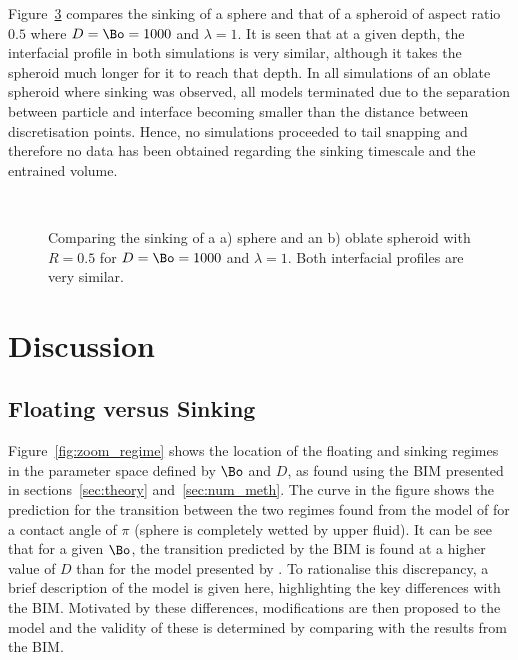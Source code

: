 {Figure~\ref{fig:sinking_comp} compares the sinking of a sphere and that of a spheroid of aspect ratio $0.5$ where $D = \Bo = 1000$ and $\lambda = 1$. It is seen that at a given depth, the interfacial profile in both simulations is very similar, although it takes the spheroid much longer for it to reach that depth. In all simulations of an oblate spheroid where sinking was observed, all models terminated due to the separation between particle and interface becoming smaller than the distance between discretisation points. Hence, no simulations proceeded to tail snapping and therefore no data has been obtained regarding the sinking timescale and the entrained volume.
    \begin{figure}
      \centering
      \begin{subfigure}[b]{0.45\textwidth}
        \resizebox{\textwidth}{!}{\Large }
        \caption{}
        \label{fig:sphere_sink}
      \end{subfigure}
      ~
      \begin{subfigure}[b]{0.45\textwidth}
        \resizebox{\textwidth}{!}{\Large }
        \caption{}
        \label{fig:ob_sink}
      \end{subfigure}
      \caption{Comparing the sinking of a a) sphere and an b) oblate spheroid with $R = 0.5$ for $D = \Bo = 1000$ and $\lambda = 1$. Both interfacial profiles are very similar.}\label{fig:sinking_comp}
    \end{figure}

\section{Discussion}
\label{sec:discuss}


\subsection{Floating versus Sinking}
\label{subsec:float_sink_discuss}

Figure~\ref{fig:zoom_regime} shows the location of the floating and sinking regimes in the parameter space defined by $\Bo$ and $D$, as found using the BIM presented in sections~\ref{sec:theory} and~\ref{sec:num_meth}. The curve in the figure shows the prediction for the transition between the two regimes found from the model of \citet{Vella06} for a contact angle of $\pi$ (sphere is completely wetted by upper fluid). It can be see that for a given $\Bo$, the transition predicted by the BIM is found at a higher value of $D$ than for the model presented by \citet{Vella06}. To rationalise this discrepancy, a brief description of the \citet{Vella06} model is given here, highlighting the key differences with the BIM. Motivated by these differences, modifications are then proposed to the \citet{Vella06} model and the validity of these is determined by comparing with the results from the BIM.

}
